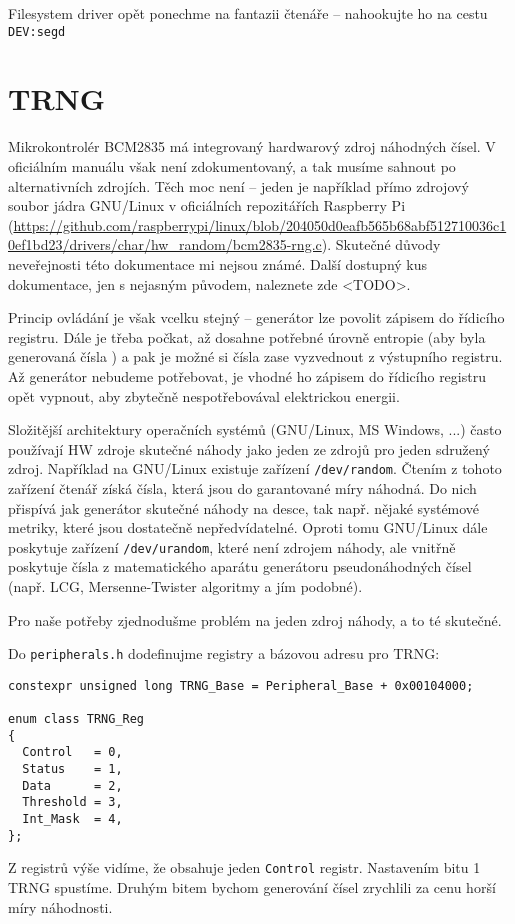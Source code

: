 \documentclass{article}
\begin{document}
Filesystem driver opět ponechme na fantazii čtenáře -- nahookujte ho na cestu \texttt{DEV:segd}

\section{TRNG}

Mikrokontrolér BCM2835 má integrovaný hardwarový zdroj náhodných čísel. V oficiálním manuálu však není zdokumentovaný, a tak musíme sahnout po alternativních zdrojích. Těch moc není -- jeden je například přímo zdrojový soubor jádra GNU/Linux v oficiálních repozitářích Raspberry Pi (\url{https://github.com/raspberrypi/linux/blob/204050d0eafb565b68abf512710036c10ef1bd23/drivers/char/hw_random/bcm2835-rng.c}). Skutečné důvody neveřejnosti této dokumentace mi nejsou známé. Další dostupný kus dokumentace, jen s nejasným původem, naleznete zde <TODO>.

Princip ovládání je však vcelku stejný -- generátor lze povolit zápisem do řídicího registru. Dále je třeba počkat, až dosahne potřebné úrovně entropie (aby byla generovaná čísla ) a pak je možné si čísla zase vyzvednout z výstupního registru. Až generátor nebudeme potřebovat, je vhodné ho zápisem do řídicího registru opět vypnout, aby zbytečně nespotřebovával elektrickou energii.

Složitější architektury operačních systémů (GNU/Linux, MS Windows, ...) často používají HW zdroje skutečné náhody jako jeden ze zdrojů pro jeden sdružený zdroj. Například na GNU/Linux existuje zařízení \texttt{/dev/random}. Čtením z tohoto zařízení čtenář získá čísla, která jsou do garantované míry náhodná. Do nich přispívá jak generátor skutečné náhody na desce, tak např. nějaké systémové metriky, které jsou dostatečně nepředvídatelné. Oproti tomu GNU/Linux dále poskytuje zařízení \texttt{/dev/urandom}, které není zdrojem  náhody, ale vnitřně poskytuje čísla z matematického aparátu generátoru pseudonáhodných čísel (např. LCG, Mersenne-Twister algoritmy a jím podobné).

Pro naše potřeby zjednodušme problém na jeden zdroj náhody, a to té skutečné.

Do \texttt{peripherals.h} dodefinujme registry a bázovou adresu pro TRNG:
\begin{lstlisting}
constexpr unsigned long TRNG_Base = Peripheral_Base + 0x00104000;

enum class TRNG_Reg
{
  Control   = 0,
  Status    = 1,
  Data      = 2,
  Threshold = 3,
  Int_Mask  = 4,
};
\end{lstlisting}
Z registrů výše vidíme, že obsahuje jeden \texttt{Control} registr. Nastavením bitu 1 TRNG spustíme. Druhým bitem bychom generování čísel zrychlili za cenu horší míry náhodnosti.
\end{document}
